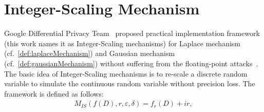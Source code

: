 






\section{Integer-Scaling Mechanism}
\label{sec:integerScalingMechanism}
Google Differential Privacy Team~\cite{googleDP2019} proposed practical implementation framework (this work names it as Integer-Scaling mechanisms) for Laplace mechanism (cf.~\autoref{def:laplaceMechanism}) and Gaussian mechanism (cf.~\autoref{def:gaussianMechanism}) without suffering from the floating-point attacks~\cite{mironov2012significance, jin2022we}.
The basic idea of Integer-Scaling mechanisms is to re-scale a discrete random variable to simulate the continuous random variable without precision loss. The framework is defined as follows:
\begin{equation}
    \begin{split}
        M_{IS}\left(f\left(D\right),r, \varepsilon, \delta \right)=f_r\left(D\right) +ir,
    \end{split}
\end{equation}

